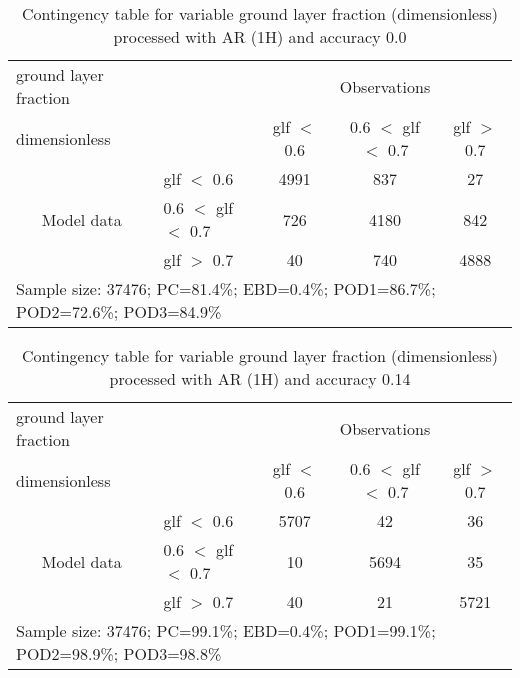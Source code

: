\documentclass[11pt,english]{article}
\begin{document}
\begin{table}[]
\begin{center}
\begin{tabular}{llccc}
\hline
{ground layer fraction}                                       &                                                    & \multicolumn{3}{c}{Observations}                 \\
{dimensionless}                                       &                             & glf $<$ 0.6   & 0.6 $<$ glf $<$ 0.7 & glf $>$ 0.7 \\
\hline
\multicolumn{1}{c}{\multirow{3}{*}{Model data}}  & glf $<$ 0.6             & 4991                & 837                       & 27              \\
                                                 & 0.6  $<$ glf $<$ 0.7 & 726                & 4180                       & 842              \\
                                                 & glf $>$ 0.7             & 40                & 740                       & 4888              \\
\hline
\multicolumn{5}{l}{Sample size: 37476; PC=81.4\%; EBD=0.4\%; POD1=86.7\%; POD2=72.6\%; POD3=84.9\%}
\end{tabular}
\end{center}
\caption{Contingency table for variable ground layer fraction (dimensionless) processed with AR (1H) and accuracy 0.0}
\label{tab:contingencyglfAFT}
\end{table}
\begin{table}[]
\begin{center}
\begin{tabular}{llccc}
\hline
{ground layer fraction}                                       &                                                    & \multicolumn{3}{c}{Observations}                 \\
{dimensionless}                                       &                             & glf $<$ 0.6   & 0.6 $<$ glf $<$ 0.7 & glf $>$ 0.7 \\
\hline
\multicolumn{1}{c}{\multirow{3}{*}{Model data}}  & glf $<$ 0.6             & 5707                & 42                       & 36              \\
                                                 & 0.6  $<$ glf $<$ 0.7 & 10                & 5694                       & 35              \\
                                                 & glf $>$ 0.7             & 40                & 21                       & 5721              \\
\hline
\multicolumn{5}{l}{Sample size: 37476; PC=99.1\%; EBD=0.4\%; POD1=99.1\%; POD2=98.9\%; POD3=98.8\%}
\end{tabular}
\end{center}
\caption{Contingency table for variable ground layer fraction (dimensionless) processed with AR (1H) and accuracy 0.14}
\label{tab:contingencyglfAFT}
\end{table}
\end{document}
